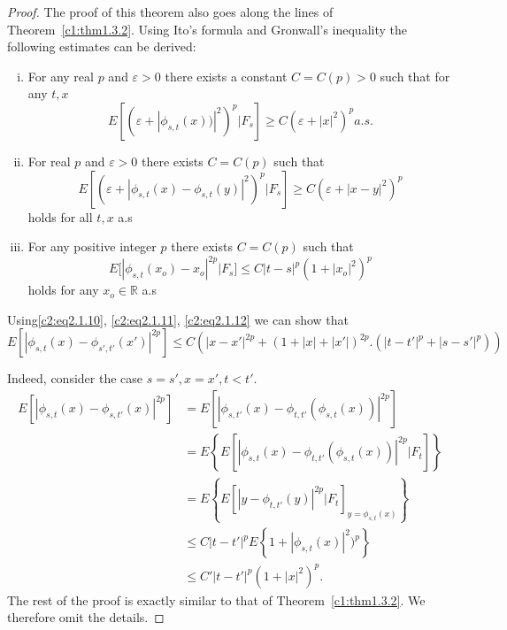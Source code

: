 \begin{proof}
  The proof of this theorem also goes along the lines of 
Theorem~\ref{c1:thm1.3.2}. Using Ito's formula and Gronwall's inequality the following
  estimates can be derived: 
  \begin{enumerate}[(i)]
  \item For any real $p$ and $\varepsilon > 0$ there exists a constant
    $C = C(p) > 0$ such that for any $t,x$ 
    \begin{equation*} 
      E [(\varepsilon + | \phi_{s,t}{{(x)}})|^2)^p|F_s] \ge C
      (\varepsilon + |x|^2)^p a.s. \tag{2.1.10}\label{c2:eq2.1.10} 
    \end{equation*}

  \item For real $p$ and $\varepsilon > 0$ there exists $C =C(p)$ such that
    \begin{equation*}
      E [(\varepsilon + | \phi_{s,t}{{(x)}}- \phi_{s,t}{{(y)}}|^2)^p
        |F_s ] \ge C (\varepsilon + |x-y|^2)^p \tag{2.1.11}\label{c2:eq2.1.11} 
    \end{equation*}
    holds for all $t,x$ a.s
  \item For any positive integer $p$ there exists $C = C(p)$ such that  
    \begin{equation*}
      E[|\phi_{s,t}{{(x_o)}} - x_o|^{2p}| F_s] \le C |t-s|^p
      (1+|x_o|^2)^p \tag{2.1.12}\label{c2:eq2.1.12} 
    \end{equation*}
    holds for any $x_o \in \mathbb{R}$ a.s
  \end{enumerate}
  
  Using\pageoriginale \eqref{c2:eq2.1.10}, \eqref{c2:eq2.1.11}, \eqref{c2:eq2.1.12} we can show that
  \begin{equation*}
    E[ | \phi _{s,t}(x)-\phi_{s',t'}(x')|^{2p}]\leq
    C(|x-x'|^{2p}+(1+|x|+|x'|)^{2p}.(|t-t'|^p+|s-s'|^p)) \tag{2.1.13}\label{c2:eq2.1.13} 
  \end{equation*} 

  Indeed, consider the case $s=s', x=x', t<t'$.
  \begin{align*}
    E\left[ | \phi _{s,t}(x)-\phi_{s,t'}(x)|^{2p}\right] & = E\left[|\phi
      _{s,t'}(x)-\phi_{t,t'}(\phi_{s,t}(x))|^{2p}\right]\\ 
    & = E\left\{E[|\phi_{s,t}(x)- \phi_{t,t'} (\phi_{s,t}(x))|^{2p}|F_t]\right\}\\
    & = E\left\{ E[|y-\phi_{t,t'}(y)|^{2p}|F_t]_{y= \phi_{s,t}(x)}\right\}\\
    & \leq C|t-t'|^{p}E \left\{ 1+|\phi_{s,t}(x)|^{2})^p\right\}\\
    & \leq C'|t-t'|^{p}(1+|x|^{2})^p.
  \end{align*}
  The rest of the proof is exactly similar to that of 
Theorem~\ref{c1:thm1.3.2}. We therefore omit the details. 
\end{proof}


